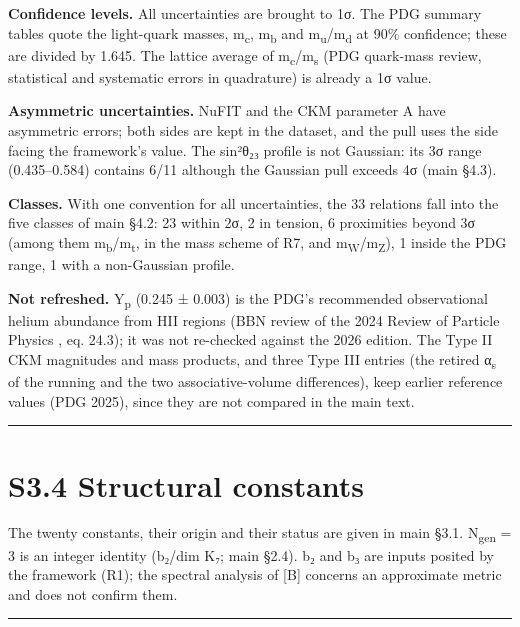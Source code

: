 \documentclass[11pt,a4paper]{article}
\begin{document}
\textbf{Confidence levels.} All uncertainties are brought to 1σ. The PDG summary tables quote the light-quark masses, m\textsubscript{c}, m\textsubscript{b} and m\textsubscript{u}/m\textsubscript{d} at 90\% confidence; these are divided by 1.645. The lattice average of m\textsubscript{c}/m\textsubscript{s} (PDG quark-mass review, statistical and systematic errors in quadrature) is already a 1σ value.

\textbf{Asymmetric uncertainties.} NuFIT and the CKM parameter A have asymmetric errors; both sides are kept in the dataset, and the pull uses the side facing the framework's value. The sin²θ₂₃ profile is not Gaussian: its 3σ range (0.435--0.584) contains 6/11 although the Gaussian pull exceeds 4σ (main §4.3).

\textbf{Classes.} With one convention for all uncertainties, the 33 relations fall into the five classes of main §4.2: 23 within 2σ, 2 in tension, 6 proximities beyond 3σ (among them m\textsubscript{b}/m\textsubscript{t}, in the mass scheme of R7, and m\textsubscript{W}/m\textsubscript{Z}), 1 inside the PDG range, 1 with a non-Gaussian profile.

\textbf{Not refreshed.} Y\textsubscript{p} (0.245 ± 0.003) is the PDG's recommended observational helium abundance from HII regions (BBN review of the 2024 Review of Particle Physics \cite{56}, eq. 24.3); it was not re-checked against the 2026 edition. The Type II CKM magnitudes and mass products, and three Type III entries (the retired α\textsubscript{s} of the running and the two associative-volume differences), keep earlier reference values (PDG 2025), since they are not compared in the main text.

\begin{center}\rule{\linewidth}{0.5pt}\end{center}

\section{S3.4 Structural constants}\label{s3.4-structural-constants}

The twenty constants, their origin and their status are given in main §3.1. N\textsubscript{gen} = 3 is an integer identity (b₂/dim K₇; main §2.4). b₂ and b₃ are inputs posited by the framework (R1); the spectral analysis of {[}B{]} concerns an approximate metric and does not confirm them.

\begin{center}\rule{\linewidth}{0.5pt}\end{center}
\end{document}
